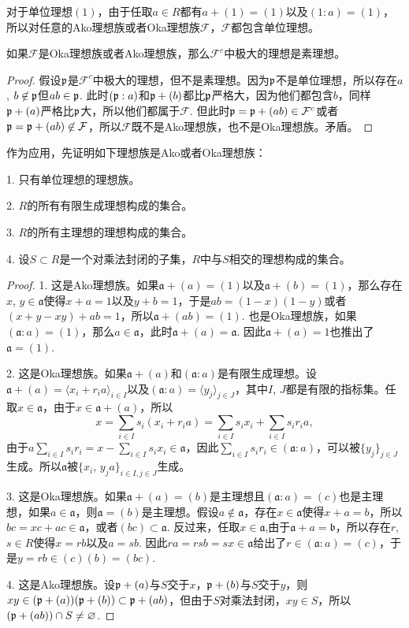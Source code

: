对于单位理想$(1)$，由于任取$a\in R$都有$a+(1)=(1)$以及$(1:a)=(1)$，所以对任意的Ako理想族或者Oka理想族$\mathcal{F}$，$\mathcal{F}$都包含单位理想。

\begin{pro} 如果$\mathcal{F}$是Oka理想族或者Ako理想族，那么$\mathcal{F}^c$中极大的理想是素理想。
\end{pro}

\begin{proof}
	假设$\mathfrak{p}$是$\mathcal{F}^c$中极大的理想，但不是素理想。因为$\mathfrak{p}$不是单位理想，所以存在$a$, $b\not\in \mathfrak{p}$但$ab\in\mathfrak{p}$. 此时$(\mathfrak{p}:a)$和$\mathfrak{p}+(b)$都比$\mathfrak{p}$严格大，因为他们都包含$b$，同样$\mathfrak{p}+(a)$严格比$\mathfrak{p}$大，所以他们都属于$\mathcal{F}$. 但此时$\mathfrak{p}=\mathfrak{p}+(ab)\in \mathcal{F}^c$或者$\mathfrak{p}=\mathfrak{p}+(ab)\not\in \mathcal{F}$，所以$\mathcal{F}$既不是Ako理想族，也不是Oka理想族。矛盾。
\end{proof}

作为应用，先证明如下理想族是Ako或者Oka理想族：

1. 只有单位理想的理想族。

2. $R$的所有有限生成理想构成的集合。

3. $R$的所有主理想的理想构成的集合。

4. 设$S\subset R$是一个对乘法封闭的子集，$R$中与$S$相交的理想构成的集合。

\begin{proof}
	1. 这是Ako理想族。如果$\mathfrak{a}+(a)=(1)$以及$\mathfrak{a}+(b)=(1)$，那么存在$x$, $y\in \mathfrak{a}$使得$x+a=1$以及$y+b=1$，于是$ab=(1-x)(1-y)$或者$(x+y-xy)+ab=1$，所以$\mathfrak{a}+(ab)=(1)$. 也是Oka理想族，如果$(\mathfrak{a}:a)=(1)$，那么$a\in \mathfrak{a}$，此时$\mathfrak{a}+(a)=\mathfrak{a}$. 因此$\mathfrak{a}+(a)=1$也推出了$\mathfrak{a}=(1)$.

	2. 这是Oka理想族。如果$\mathfrak{a}+(a)$和$(\mathfrak{a}:a)$是有限生成理想。设$\mathfrak{a}+(a)=\langle x_i+r_ia \rangle_{i\in I}$以及$(\mathfrak{a}:a)=\langle y_j\rangle_{j\in J}$，其中$I$, $J$都是有限的指标集。任取$x\in \mathfrak{a}$，由于$x\in \mathfrak{a}+(a)$，所以
	\[
		x= \sum_{i\in I}s_i(x_i+r_ia)=\sum_{i\in I}s_ix_i+\sum_{i\in I}s_ir_ia,
	\]
	由于$a\sum_{i\in I}s_ir_i=x-\sum_{i\in I}s_ix_i\in \mathfrak{a}$，因此$\sum_{i\in I}s_ir_i\in (\mathfrak{a}:a)$，可以被$\{y_j\}_{j\in J}$生成。所以$\mathfrak{a}$被$\{x_i$, $y_ja\}_{i\in I,j\in J}$生成。

	3. 这是Oka理想族。如果$\mathfrak{a}+(a)=(b)$是主理想且$(\mathfrak{a}:a)=(c)$也是主理想，如果$a\in \mathfrak{a}$，则$\mathfrak{a}=(b)$是主理想。假设$a\not\in\mathfrak{a}$，存在$x\in \mathfrak{a}$使得$x+a=b$，所以$bc=xc+ac\in \mathfrak{a}$，或者$(bc)\subset \mathfrak{a}$. 反过来，任取$x\in \mathfrak{a}$,由于$\mathfrak{a}+a=\mathfrak{b}$，所以存在$r$, $s\in R$使得$x=rb$以及$a=sb$. 因此$ra=rsb=sx\in\mathfrak{a}$给出了$r\in (\mathfrak{a}:a)=(c)$，于是$y=rb\in (c)(b)=(bc)$.

	4. 这是Ako理想族。设$\mathfrak{p}+(a)$与$S$交于$x$，$\mathfrak{p}+(b)$与$S$交于$y$，则$xy\in (\mathfrak{p}+(a))(\mathfrak{p}+(b))\subset \mathfrak{p}+(ab)$，但由于$S$对乘法封闭，$xy\in S$，所以$(\mathfrak{p}+(ab))\cap S\neq \varnothing$.
\end{proof}

